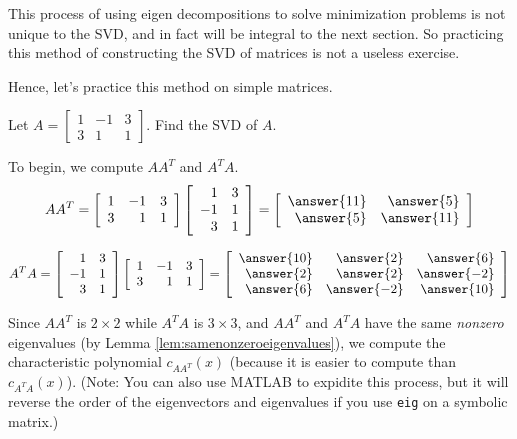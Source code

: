 \documentclass{ximera}
\begin{document}
\begin{remark}
  This process of using eigen decompositions to solve minimization problems is not unique to the SVD, and in fact will be integral to the next section. So practicing this method of constructing the SVD of matrices is not a useless exercise.

  Hence, let's practice this method on simple matrices.
\end{remark}


 
\begin{example}\label{ex:SVD2x3}
Let
$A=\left[\begin{array}{rrr} 1 & -1 & 3 \\ 3 & 1 & 1 \end{array}\right]$.
Find the SVD of $A$.
 


To begin, we compute $AA^T$ and $A^TA$.
\[ AA^T = \left[\begin{array}{rrr} 1 & -1 & 3 \\ 3 & 1 & 1 \end{array}\right]
\left[\begin{array}{rr} 1 & 3 \\ -1 & 1 \\ 3 & 1  \end{array}\right]
= \left[\begin{array}{rr} \answer{11} & \answer{5} \\ \answer{5} & \answer{11}  \end{array}\right]\]
 
\[ A^TA = \left[\begin{array}{rr} 1 & 3 \\ -1 & 1 \\ 3 & 1  \end{array}\right]
\left[\begin{array}{rrr} 1 & -1 & 3 \\ 3 & 1 & 1 \end{array}\right]
= \left[\begin{array}{rrr} 
  \answer{10} & \answer{2} & \answer{6} \\ 
  \answer{2} & \answer{2} & \answer{-2} \\ 
  \answer{6} & \answer{-2} & \answer{10} 
  \end{array}\right]
\]



Since $AA^T$ is $2\times 2$ while $A^T A$ is $3\times 3$, and $AA^T$
and $A^TA$ have the same {\em nonzero} eigenvalues (by Lemma
\ref{lem:samenonzeroeigenvalues}), we compute the characteristic polynomial  $c_{AA^T}(x)$ (because it is
easier to compute than $c_{A^TA}(x)$). (Note: You can also use MATLAB to expidite this process, but it will reverse the order of the eigenvectors and eigenvalues if you use \texttt{eig} on a symbolic matrix.)


\end{example}
\end{document}
